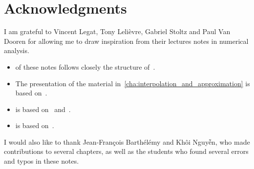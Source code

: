 \chapter*{Acknowledgments}%
\label{cha:acknowledgements}

I am grateful to Vincent Legat, Tony Lelièvre, Gabriel Stoltz and Paul Van Dooren for allowing me to draw inspiration from their lectures notes in numerical analysis.
\begin{itemize}
    \item 
         of these notes follows closely the structure of~\cite[Chapter 3]{VanDooren}.

    \item 
        The presentation of the material in~\cref{cha:interpolation_and_approximation} is based on~\cite{Legat}.

    \item
         is based on~\cite[Chapter 2]{cs} and~\cite[Chapter 5]{VanDooren}.

    \item
         is based on~\cite[Chapter 3]{cs}.
\end{itemize}
I would also like to thank Jean-François Barthélémy and Kh\^oi Nguy\~{\^e}n,
who made contributions to several chapters,
as well as the students who found several errors and typos in these notes.
